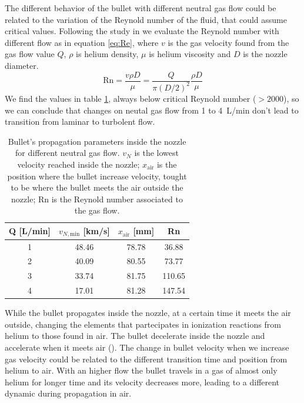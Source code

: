 The different behavior of the bullet with different neutral gas flow could be related to the variation of the Reynold number of the fluid, that could assume critical values. Following the study in \cite{doi:10.1063/1.4819246} we evaluate the Reynold number with different flow as in equation \ref{eq:Re}, where $v$ is the gas velocity found from the gas flow value $Q$, $\rho$ is helium density, $\mu$ is helium viscosity and $D$ is the nozzle diameter.
\begin{equation}
 \text{Rn} = \frac{v \rho D}{\mu} = \frac{Q}{\pi (D/2)^2} \frac{\rho D}{\mu}
 \label{eq:Re}
\end{equation}
We find the values in table \ref{tab:elio_Re}, always below critical Reynold number ($> \num{2000}$), so we can conclude that changes on neutal gas flow from \num{1} to \SI{4}{\liter/\minute} don't lead to transition from laminar to turbolent flow.
\begin{table}
  \centering
  \begin{tabular}{cccc}
  \toprule
  Q [L/min]   &$v_{N,\text{min}}$ [km/s]   &$x_{\text{air}}$ [\si{\milli\meter}]   &Rn\\
  \midrule
  1    &\num{48.46}    &\num{78.78}     &\num{36.88}\\
  2    &\num{40.09}    &\num{80.55}     &\num{73.77}\\
  3    &\num{33.74}    &\num{81.75}     &\num{110.65}\\
  4    &\num{17.01}    &\num{81.28}     &\num{147.54}\\
  \bottomrule
  \end{tabular}
  \caption{Bullet's propagation parameters inside the nozzle for different neutral gas flow. $v_{N}$ is the lowest velocity reached inside the nozzle; $x_{\text{air}}$ is the position where the bullet increase velocity, tought to be where the bullet meets the air outside the nozzle; Rn is the Reynold number associated to the gas flow.}
  \label{tab:elio_Re}
\end{table}

While the bullet propagates inside the nozzle, at a certain time it meets the air outside, changing the elements that partecipates in ionization reactions from helium to those found in air. The bullet decelerate inside the nozzle and accelerate when it meets air (\cite{Jarrige_2010}).
The change in bullet velocity when we increase gas velocity could be related to the different transition time and position from helium to air. With an higher flow the bullet travels in a gas of almost only helium for longer time and its velocity decreases more, leading to a different dynamic during propagation in air.




